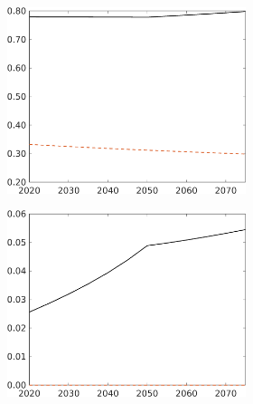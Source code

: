 \begin{figure}[h!!]
\begin{subfigure}{1\textwidth}
\begin{subfigure}[]{0.32\textwidth}
\end{subfigure}	
\begin{subfigure}[]{0.32\textwidth}
	\includegraphics[width=1\textwidth]{../../codding_model/own_basedOnFried/optimalPol_010922_revision/figures/all_13Sept22_Tplus30/sn_LFCompSP_T_regime4_knspil0_spillover0_noskill0_sep0_xgrowth0_PV1_etaa0.79_lgd0.png}
\end{subfigure}	
\begin{subfigure}[]{0.32\textwidth}
	\includegraphics[width=1\textwidth]{../../codding_model/own_basedOnFried/optimalPol_010922_revision/figures/all_13Sept22_Tplus30/sg_LFCompSP_T_regime4_knspil0_spillover0_noskill0_sep0_xgrowth0_PV1_etaa0.79_lgd0.png}
\end{subfigure}	
\end{subfigure}	
\end{figure}
\clearpage

